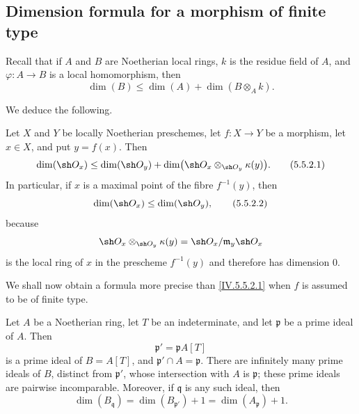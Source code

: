 \subsection{Dimension formula for a morphism of finite type}
\label{subsection:IV.5.5}
\label{IV.5.5}

\begin{env}[5.5.1]
\label{IV.5.5.1}


Recall  that if $A$ and $B$ are Noetherian local
rings, $k$ is the residue field of $A$, and
$\varphi:A\to B$ is a local homomorphism, then
\begin{equation}
\dim(B)\leq\dim(A)+\dim(B\otimes_A k).
\tag{5.5.1.1}\label{IV.5.5.1.1}
\end{equation}
\end{env}

We deduce the following.

\begin{proposition}[5.5.2]
\label{IV.5.5.2}
Let $X$ and $Y$ be locally Noetherian preschemes, let
$f:X\to Y$ be a morphism, let $x\in X$, and put $y=f(x)$.
Then
\begin{equation}
\dim(\sh O_x)
 \leq\dim(\sh O_y)
   +\dim\bigl(\sh O_x\otimes_{\sh O_y}\kappa(y)\bigr).
\tag{5.5.2.1}\label{IV.5.5.2.1}
\end{equation}
In particular, if $x$ is a maximal point of the fibre $f^{-1}(y)$,
then
\begin{equation}
\dim(\sh O_x)\leq\dim(\sh O_y),
\tag{5.5.2.2}\label{IV.5.5.2.2}
\end{equation}
because
\[
\sh O_x\otimes_{\sh O_y}\kappa(y)
  =\sh O_x/\mathfrak m_y\sh O_x
\]
is the local ring of $x$ in the prescheme $f^{-1}(y)$ and therefore
has dimension $0$.
\end{proposition}


We shall now obtain a formula more precise than
\eqref{IV.5.5.2.1} when $f$ is assumed to be of finite type.

\begin{proposition}[5.5.3]
\label{IV.5.5.3}
Let $A$ be a Noetherian ring, let $T$ be an indeterminate, and let
$\mathfrak p$ be a prime ideal of $A$.
Then
\[
\mathfrak p'=\mathfrak pA[T]
\]
is a prime ideal of $B=A[T]$, and
$\mathfrak p'\cap A=\mathfrak p$.
There are infinitely many prime ideals of $B$, distinct from
$\mathfrak p'$, whose intersection with $A$ is $\mathfrak p$; these
prime ideals are pairwise incomparable.
Moreover, if $\mathfrak q$ is any such ideal, then
\begin{equation}
\dim(B_{\mathfrak q})
  =\dim(B_{\mathfrak p'})+1
  =\dim(A_{\mathfrak p})+1.
\tag{5.5.3.1}\label{IV.5.5.3.1}
\end{equation}
\end{proposition}

